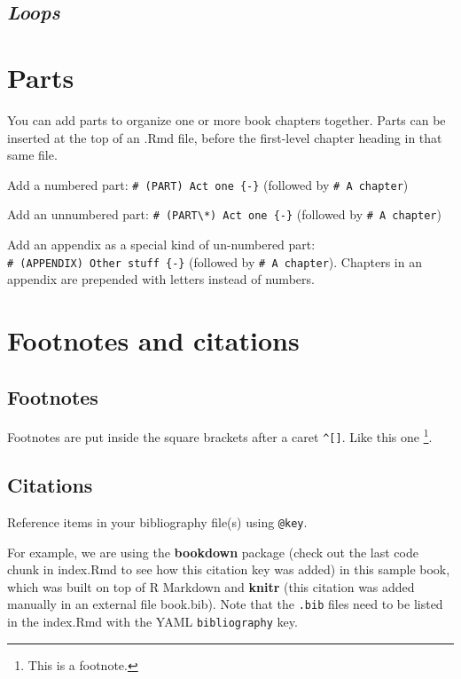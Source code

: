 \documentclass[
]{book}
\theoremstyle{definition}
\theoremstyle{definition}
\theoremstyle{definition}
\theoremstyle{definition}
\theoremstyle{remark}
\begin{document}
\hypertarget{loops}{%
\section{\texorpdfstring{\emph{Loops}}{Loops}}\label{loops}}

\hypertarget{parts}{%
\chapter{Parts}\label{parts}}

You can add parts to organize one or more book chapters together. Parts can be inserted at the top of an .Rmd file, before the first-level chapter heading in that same file.

Add a numbered part: \texttt{\#\ (PART)\ Act\ one\ \{-\}} (followed by \texttt{\#\ A\ chapter})

Add an unnumbered part: \texttt{\#\ (PART\textbackslash{}*)\ Act\ one\ \{-\}} (followed by \texttt{\#\ A\ chapter})

Add an appendix as a special kind of un-numbered part: \texttt{\#\ (APPENDIX)\ Other\ stuff\ \{-\}} (followed by \texttt{\#\ A\ chapter}). Chapters in an appendix are prepended with letters instead of numbers.

\hypertarget{footnotes-and-citations}{%
\chapter{Footnotes and citations}\label{footnotes-and-citations}}

\hypertarget{footnotes}{%
\section{Footnotes}\label{footnotes}}

Footnotes are put inside the square brackets after a caret \texttt{\^{}{[}{]}}. Like this one \footnote{This is a footnote.}.

\hypertarget{citations}{%
\section{Citations}\label{citations}}

Reference items in your bibliography file(s) using \texttt{@key}.

For example, we are using the \textbf{bookdown} package \citep{R-bookdown} (check out the last code chunk in index.Rmd to see how this citation key was added) in this sample book, which was built on top of R Markdown and \textbf{knitr} \citep{xie2015} (this citation was added manually in an external file book.bib).
Note that the \texttt{.bib} files need to be listed in the index.Rmd with the YAML \texttt{bibliography} key.
\end{document}
